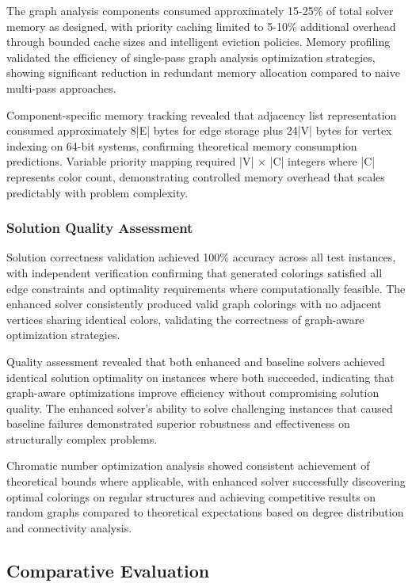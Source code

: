 The graph analysis components consumed approximately 15-25\% of total solver memory as designed, with priority caching limited to 5-10\% additional overhead through bounded cache sizes and intelligent eviction policies. Memory profiling validated the efficiency of single-pass graph analysis optimization strategies, showing significant reduction in redundant memory allocation compared to naive multi-pass approaches.

Component-specific memory tracking revealed that adjacency list representation consumed approximately 8|E| bytes for edge storage plus 24|V| bytes for vertex indexing on 64-bit systems, confirming theoretical memory consumption predictions. Variable priority mapping required |V| × |C| integers where |C| represents color count, demonstrating controlled memory overhead that scales predictably with problem complexity.

\subsubsection{Solution Quality Assessment}

Solution correctness validation achieved 100\% accuracy across all test instances, with independent verification confirming that generated colorings satisfied all edge constraints and optimality requirements where computationally feasible. The enhanced solver consistently produced valid graph colorings with no adjacent vertices sharing identical colors, validating the correctness of graph-aware optimization strategies.

Quality assessment revealed that both enhanced and baseline solvers achieved identical solution optimality on instances where both succeeded, indicating that graph-aware optimizations improve efficiency without compromising solution quality. The enhanced solver's ability to solve challenging instances that caused baseline failures demonstrated superior robustness and effectiveness on structurally complex problems.

Chromatic number optimization analysis showed consistent achievement of theoretical bounds where applicable, with enhanced solver successfully discovering optimal colorings on regular structures and achieving competitive results on random graphs compared to theoretical expectations based on degree distribution and connectivity analysis.

\subsection{Comparative Evaluation}

